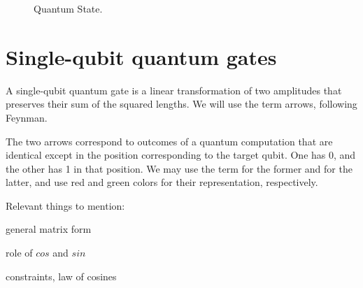 \documentclass[11pt, letterpaper]{article}
\def\onecol{true}
\newcommand{\myvspace}[1]{\vspace{0.0in}}
\begin{document}
  \begin{figure}[hbt]
	\begin{centering}
		\ifthenelse{\equal{\onecol}{true}}{ \def\xyz{.3}}{ \def\xyz{.36}}
		\def\zyx{.005}
		{\setlength\fboxsep{0pt}}\hspace{\zyx\columnwidth}
		
		\caption{Quantum State.} 
		\label{fig:state}
	\end{centering}
\end{figure}
\myvspace{-.1in}


\newpage

\section{Single-qubit quantum gates}
\label{sec:gates}
A single-qubit quantum gate is a linear transformation of two amplitudes that preserves their sum of the squared lengths. We will use the term arrows, following Feynman.

The  two arrows correspond to outcomes of a quantum computation that are identical except in the position corresponding to the target qubit. One has 0, and the other has 1 in that position. We may use the term  for the former and  for the latter, and use red and green colors for their representation, respectively.

Relevant things to mention:
\begin{compactitem}
\item  general matrix form 
\item  role of $cos$ and $sin$
\item constraints, law of cosines
\end{compactitem}
\end{document}
